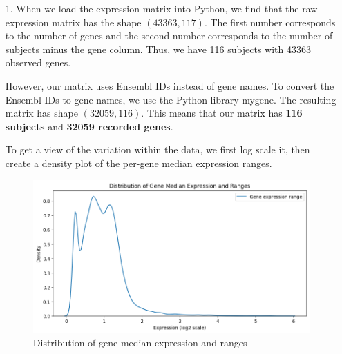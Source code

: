 \documentclass[12pt]{exam}
\begin{document}
\begin{itemize}
	\item [1.] When we load the expression matrix into Python, we find that the raw expression matrix has the shape $(43363, 117)$. The first number corresponds to the number of genes and the second number corresponds to the number of subjects minus the gene column. Thus, we have 116 subjects with 43363 observed genes. \par However, our matrix uses Ensembl IDs instead of gene names. To convert the Ensembl IDs to gene names, we use the Python library mygene. The resulting matrix has shape $(32059, 116)$. This means that our matrix has \textbf{116 subjects} and \textbf{32059 recorded genes}. \par To get a view of the variation within the data, we first log scale it, then create a density plot of the per-gene median expression ranges. 
	\begin{figure}[h]
\centering
\includegraphics[scale=0.5]{figure_1.png}
\caption{Distribution of gene median expression and ranges}
\label{fig:gene median expression}
\end{figure}
\pagebreak


\end{itemize}
\end{document}
